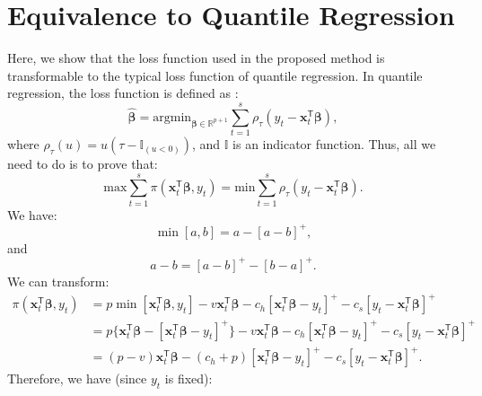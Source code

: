 \documentclass{article}
\begin{document}
\section{Equivalence to Quantile Regression}
\label{app:C}
Here, we show that the loss function used in the proposed method is transformable to the typical loss function of quantile regression. In quantile regression, the loss function is defined as \cite{KH01}:
\[
    \hat{\boldsymbol{\beta}}=\text{argmin}_{\boldsymbol{\beta}\in \mathbb{R}^{p+1}}\displaystyle\sum_{t=1}^s\rho_{\tau}(y_t-\mathbf{x}_t^{\mathsf{T}}\boldsymbol{\beta}),
\]
where $\displaystyle \rho_{\tau}(u)=u(\tau-\mathbb{I}_{(u<0)})$, and $\mathbb{I}$ is an indicator function. Thus, all we need to do is to prove that:
\[
    \text{max}\displaystyle\sum_{t=1}^s{\pi(\mathbf{x}_t^{\mathsf{T}}\boldsymbol{\beta},y_t)}=\text{min}\displaystyle\sum_{t=1}^s\rho_{\tau}(y_t-\mathbf{x}_t^{\mathsf{T}}\boldsymbol{\beta}).
\]
We have:
\[
    \min[a,b]=a-[a-b]^+,
\]
and
\[
    a-b=[a-b]^+-[b-a]^+.
\]
We can transform:
\[
    \begin{aligned}
        \pi(\mathbf{x}_t^{\mathsf{T}}\boldsymbol{\beta},y_t)
        &=p\min[\mathbf{x}_t^{\mathsf{T}}\boldsymbol{\beta},y_t]-v\mathbf{x}_t^{\mathsf{T}}\boldsymbol{\beta}-c_h[\mathbf{x}_t^{\mathsf{T}}\boldsymbol{\beta}-y_t]^+-c_s[y_t-\mathbf{x}_t^{\mathsf{T}}\boldsymbol{\beta}]^+\\
        &=p\{\mathbf{x}_t^{\mathsf{T}}\boldsymbol{\beta}-[\mathbf{x}_t^{\mathsf{T}}\boldsymbol{\beta}-y_t]^+\}-v\mathbf{x}_t^{\mathsf{T}}\boldsymbol{\beta}-c_h[\mathbf{x}_t^{\mathsf{T}}\boldsymbol{\beta}-y_t]^+-c_s[y_t-\mathbf{x}_t^{\mathsf{T}}\boldsymbol{\beta}]^+\\
        &=(p-v)\mathbf{x}_t^{\mathsf{T}}\boldsymbol{\beta}-(c_h+p)[\mathbf{x}_t^{\mathsf{T}}\boldsymbol{\beta}-y_t]^+-c_s[y_t-\mathbf{x}_t^{\mathsf{T}}\boldsymbol{\beta}]^+.
    \end{aligned}
\]
Therefore, we have (since $y_t$ is fixed):
\end{document}
